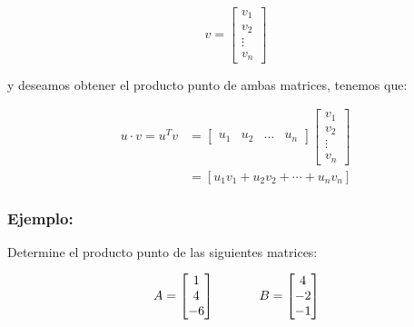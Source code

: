 \documentclass{article}
\begin{document}
    \begin{equation}
        v=\left[\begin{array}{c}
        v_{1}  \\
        v_{2}  \\
        \vdots \\
        v_{n}
        \end{array}\right]
    \end{equation}

    y deseamos obtener el producto punto de ambas matrices, tenemos que:

    \begin{equation}
        \begin{aligned}
            u \cdot v=u^{T} v &= \left[\begin{array}{llll}
            u_{1} & u_{2} & \ldots & u_{n}
            \end{array}\right]\left[\begin{array}{c}
            v_{1} \\
            v_{2} \\
            \vdots \\
            v_{n}
            \end{array}\right] \\ &= \left[u_{1} v_{1}+u_{2} v_{2}+\cdots+u_{n} v_{n}\right]
        \end{aligned}
    \end{equation}

    \subsubsection*{Ejemplo:}

    Determine el producto punto de las siguientes matrices:

    \begin{gather*}
        A = \begin{bmatrix}
            1  \\
            4  \\
            -6
        \end{bmatrix} \hspace{35 pt}
        B = \begin{bmatrix}
            4  \\
            -2 \\
            -1
        \end{bmatrix}
    \end{gather*}
\end{document}
